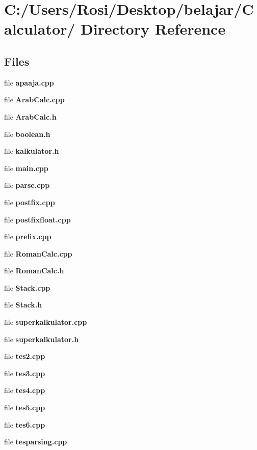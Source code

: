 \section{C:/Users/Rosi/Desktop/belajar/Calculator/ Directory Reference}
\label{dir_C_3A_2FUsers_2FRosi_2FDesktop_2Fbelajar_2FCalculator_2F}


\subsection*{Files}
\begin{CompactItemize}
\item 
file {\bf apaaja.cpp}
\item 
file {\bf Arab\-Calc.cpp}
\item 
file {\bf Arab\-Calc.h}
\item 
file {\bf boolean.h}
\item 
file {\bf kalkulator.h}
\item 
file {\bf main.cpp}
\item 
file {\bf parse.cpp}
\item 
file {\bf postfix.cpp}
\item 
file {\bf postfixfloat.cpp}
\item 
file {\bf prefix.cpp}
\item 
file {\bf Roman\-Calc.cpp}
\item 
file {\bf Roman\-Calc.h}
\item 
file {\bf Stack.cpp}
\item 
file {\bf Stack.h}
\item 
file {\bf superkalkulator.cpp}
\item 
file {\bf superkalkulator.h}
\item 
file {\bf tes2.cpp}
\item 
file {\bf tes3.cpp}
\item 
file {\bf tes4.cpp}
\item 
file {\bf tes5.cpp}
\item 
file {\bf tes6.cpp}
\item 
file {\bf tesparsing.cpp}
\end{CompactItemize}
